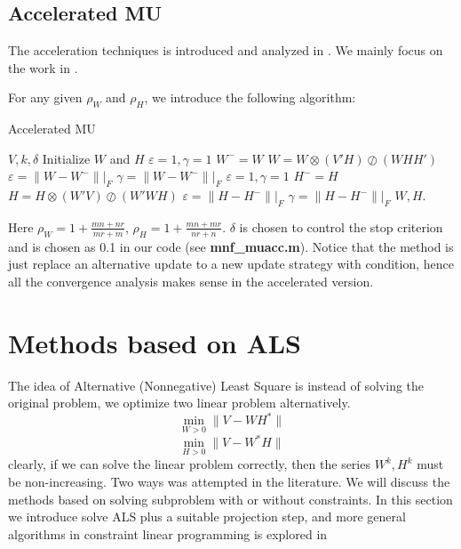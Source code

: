 \documentclass{article}
\begin{document}
\subsection{Accelerated MU}
The acceleration techniques is introduced and analyzed in \cite{muacc, mumod2}. We mainly focus on the work in \cite{muacc}.

For any given $\rho_W$ and $\rho_H$, we introduce the following algorithm:
\begin{algorithm}[H]
	\caption{Accelerated MU}
	\begin{algorithmic}[1]
		\REQUIRE $V, k, \delta$
		\STATE Initialize $W$ and $H$ 
		\STATE $\varepsilon=1, \gamma = 1$
		\STATE $W^-=W$
		\STATE $ W = W\otimes (V'H) \oslash (WHH')$
		\STATE $\varepsilon = \|W-W^-\||_F$
		\ENDIF
		\STATE $\gamma = \|W-W^-\||_F$
		\ENDWHILE
		\STATE $\varepsilon=1, \gamma = 1$
		\STATE $H^-=H$
		\STATE $H = H\otimes (W'V) \oslash (W'WH) $
		\STATE $\varepsilon = \|H-H^-\||_F$
		\ENDIF
		\STATE $\gamma = \|H-H^-\||_F$
		\ENDWHILE
		\ENDWHILE
		\STATE \Return $W,H$.
	\end{algorithmic}
\end{algorithm}
Here $\rho_W = 1+\frac{mn+nr}{mr+m}$, $\rho_H = 1+\frac{mn+mr}{nr+n}$. $\delta$ is chosen to control the stop criterion and is chosen as 0.1 in our code (see \textbf{mnf\_muacc.m}).
Notice that the method is just replace an alternative update to a new update strategy with condition, hence all the convergence analysis makes sense in the accelerated version. 

\section{Methods based on ALS}

The idea of Alternative (Nonnegative) Least Square is instead of solving the original problem, we optimize two linear problem alternatively.
\begin{equation}
\min_{W>0} \|V-WH^*\|
\end{equation}
\begin{equation}
\min_{H>0} \|V-W^*H\|
\end{equation}
clearly, if we can solve the linear problem correctly, then the series $W^k, H^k$ must be non-increasing. Two ways was attempted in the literature. We will discuss the methods based on solving subproblem with or without constraints. In this section we introduce solve ALS plus a suitable projection step, and more general algorithms in constraint linear programming is explored in 
\end{document}
